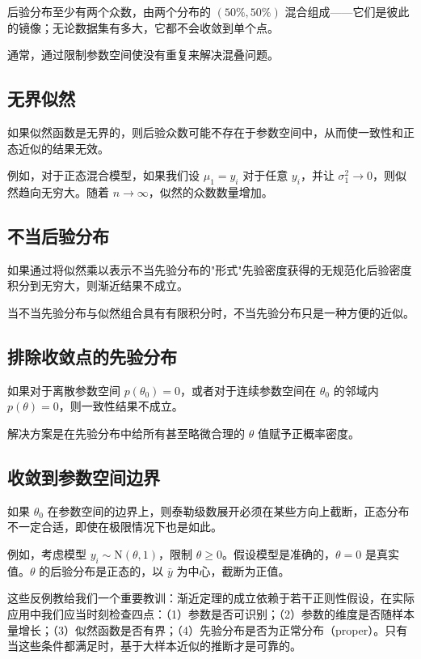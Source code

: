 后验分布至少有两个众数，由两个分布的 $(50\%, 50\%)$ 混合组成——它们是彼此的镜像；无论数据集有多大，它都不会收敛到单个点。

通常，通过限制参数空间使没有重复来解决混叠问题。

\subsection{无界似然}

如果似然函数是无界的，则后验众数可能不存在于参数空间中，从而使一致性和正态近似的结果无效。

例如，对于正态混合模型，如果我们设 $\mu_1 = y_i$ 对于任意 $y_i$，并让 $\sigma_1^2 \to 0$，则似然趋向无穷大。随着 $n \to \infty$，似然的众数数量增加。

\subsection{不当后验分布}

如果通过将似然乘以表示不当先验分布的"形式"先验密度获得的无规范化后验密度积分到无穷大，则渐近结果不成立。

当不当先验分布与似然组合具有有限积分时，不当先验分布只是一种方便的近似。

\subsection{排除收敛点的先验分布}

如果对于离散参数空间 $p(\theta_0) = 0$，或者对于连续参数空间在 $\theta_0$ 的邻域内 $p(\theta) = 0$，则一致性结果不成立。

解决方案是在先验分布中给所有甚至略微合理的 $\theta$ 值赋予正概率密度。

\subsection{收敛到参数空间边界}

如果 $\theta_0$ 在参数空间的边界上，则泰勒级数展开必须在某些方向上截断，正态分布不一定合适，即使在极限情况下也是如此。

例如，考虑模型 $y_i \sim \mathrm{N}(\theta, 1)$，限制 $\theta \geq 0$。假设模型是准确的，$\theta = 0$ 是真实值。$\theta$ 的后验分布是正态的，以 $\bar{y}$ 为中心，截断为正值。

这些反例教给我们一个重要教训：渐近定理的成立依赖于若干正则性假设，在实际应用中我们应当时刻检查四点：（1）参数是否可识别；（2）参数的维度是否随样本量增长；（3）似然函数是否有界；（4）先验分布是否为正常分布（proper）。只有当这些条件都满足时，基于大样本近似的推断才是可靠的。

